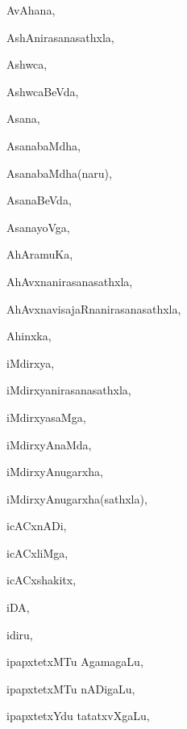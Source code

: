 \begin{multicols}{3}
{\noindent
{AvAhana}, \pageref{AvAhana}

\noindent
{AshAnirasanasathxla}, \pageref{AshAnirasanasathxla}

\noindent
{Ashwca}, \pageref{Ashwca}

\noindent
{AshwcaBeVda}, \pageref{AshwcaBeVda}

\noindent
{Asana}, \pageref{Asana}

\noindent
{AsanabaMdha}, \pageref{AsanabaMdha}

\noindent
{AsanabaMdha(naru)}, \pageref{AsanabaMdha(naru)}

\noindent
{AsanaBeVda}, \pageref{AsanaBeVda}

\noindent
{AsanayoVga}, \pageref{AsanayoVga}

\noindent
{AhAramuKa}, \pageref{AhAramuKa}

\noindent
{AhAvxnanirasanasathxla}, \pageref{AhAvxnanirasanasathxla}

\noindent
{AhAvxnavisajaRnanirasanasathxla}, \pageref{AhAvxnavisajaRnanirasanasathxla}

\noindent
{Ahinxka}, \pageref{Ahinxka}

\bigskip
\noindent
{}
\smallskip

\noindent
{iMdirxya}, \pageref{iMdirxya}

\noindent
{iMdirxyanirasanasathxla}, \pageref{iMdirxyanirasanasathxla}

\noindent
{iMdirxyasaMga}, \pageref{iMdirxyasaMga}

\noindent
{iMdirxyAnaMda}, \pageref{iMdirxyAnaMda}

\noindent
{iMdirxyAnugarxha}, \pageref{iMdirxyAnugarxha}

\noindent
{iMdirxyAnugarxha(sathxla)}, \pageref{iMdirxyAnugarxha(sathxla)}

\noindent
{icACxnADi}, \pageref{icACxnADi}

\noindent
{icACxliMga}, \pageref{icACxliMga}

\noindent
{icACxshakitx}, \pageref{icACxshakitx}

\noindent
{iDA}, \pageref{iDA}

\noindent
{idiru}, \pageref{idiru}

\noindent
{ipapxtetxMTu AgamagaLu}, \pageref{ipapxtetxMTu AgamagaLu}

\noindent
{ipapxtetxMTu nADigaLu}, \pageref{ipapxtetxMTu nADigaLu}

\noindent
{ipapxtetxYdu tatatxvXgaLu}, \pageref{ipapxtetxYdu tatatxvXgaLu}

}
\end{multicols}
